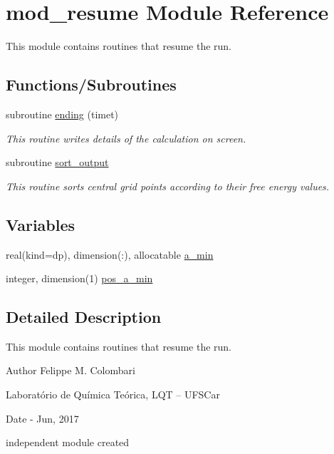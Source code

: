 \hypertarget{namespacemod__resume}{}\section{mod\+\_\+resume Module Reference}
\label{namespacemod__resume}


This module contains routines that resume the run.  


\subsection*{Functions/\+Subroutines}
\begin{DoxyCompactItemize}
\item 
subroutine \hyperlink{namespacemod__resume_a74e0ed44fafff381d91477160c6d8a74}{ending} (timet)
\begin{DoxyCompactList}\small\item\em This routine writes details of the calculation on screen. \end{DoxyCompactList}\item 
subroutine \hyperlink{namespacemod__resume_a36133bfde88e19b38e5d5245c89843fe}{sort\+\_\+output}
\begin{DoxyCompactList}\small\item\em This routine sorts central grid points according to their free energy values. \end{DoxyCompactList}\end{DoxyCompactItemize}
\subsection*{Variables}
\begin{DoxyCompactItemize}
\item 
real(kind=dp), dimension(\+:), allocatable \hyperlink{namespacemod__resume_ad3cf0f0162ccc00d0efebb0348fe6ae5}{a\+\_\+min}
\item 
integer, dimension(1) \hyperlink{namespacemod__resume_a2861e2f353be05850b4ad384446859c6}{pos\+\_\+a\+\_\+min}
\end{DoxyCompactItemize}


\subsection{Detailed Description}
This module contains routines that resume the run. 

\begin{DoxyAuthor}{Author}
Felippe M. Colombari
\begin{DoxyItemize}
\item Laboratório de Química Teórica, L\+QT -- U\+F\+S\+Car 
\end{DoxyItemize}
\end{DoxyAuthor}
\begin{DoxyDate}{Date}
-\/ Jun, 2017
\begin{DoxyItemize}
\item independent module created 
\end{DoxyItemize}
\end{DoxyDate}


